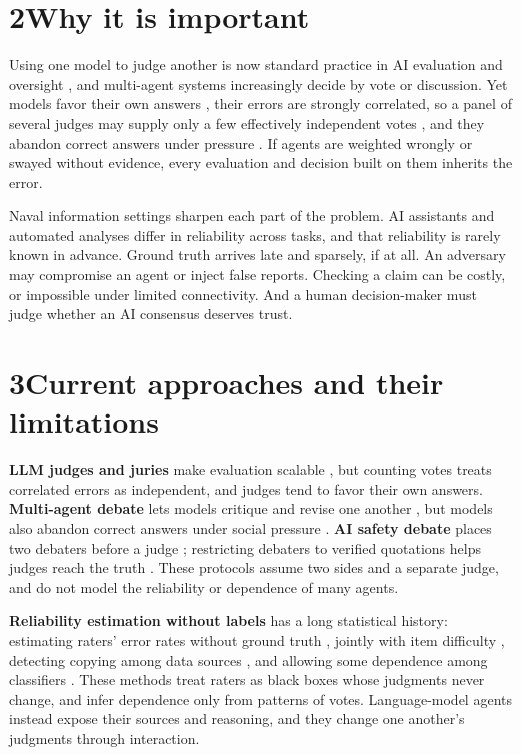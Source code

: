 \documentclass[11pt,letterpaper]{article}
\begin{document}
\section*{2\quad Why it is important}
Using one model to judge another is now standard practice in AI evaluation and oversight \cite{zheng2023judging,verga2024juries}, and multi-agent systems increasingly decide by vote or discussion. Yet models favor their own answers \cite{zheng2023judging}, their errors are strongly correlated, so a panel of several judges may supply only a few effectively independent votes \cite{kim2025correlated,kohli2026nine}, and they abandon correct answers under pressure \cite{sharma2024sycophancy}. If agents are weighted wrongly or swayed without evidence, every evaluation and decision built on them inherits the error.

Naval information settings sharpen each part of the problem. AI assistants and automated analyses differ in reliability across tasks, and that reliability is rarely known in advance. Ground truth arrives late and sparsely, if at all. An adversary may compromise an agent or inject false reports. Checking a claim can be costly, or impossible under limited connectivity. And a human decision-maker must judge whether an AI consensus deserves trust.

\section*{3\quad Current approaches and their limitations}
\textbf{LLM judges and juries} make evaluation scalable \cite{zheng2023judging,verga2024juries}, but counting votes treats correlated errors as independent, and judges tend to favor their own answers. \textbf{Multi-agent debate} lets models critique and revise one another \cite{du2024debate}, but models also abandon correct answers under social pressure \cite{sharma2024sycophancy,laban2023flipflop}. \textbf{AI safety debate} places two debaters before a judge \cite{irving2018debate}; restricting debaters to verified quotations helps judges reach the truth \cite{khan2024debating}. These protocols assume two sides and a separate judge, and do not model the reliability or dependence of many agents.

\textbf{Reliability estimation without labels} has a long statistical history: estimating raters' error rates without ground truth \cite{dawid1979maximum}, jointly with item difficulty \cite{whitehill2009whose}, detecting copying among data sources \cite{dong2009dependence}, and allowing some dependence among classifiers \cite{jaffe2016dependent}. These methods treat raters as black boxes whose judgments never change, and infer dependence only from patterns of votes. Language-model agents instead expose their sources and reasoning, and they change one another's judgments through interaction.
\end{document}
